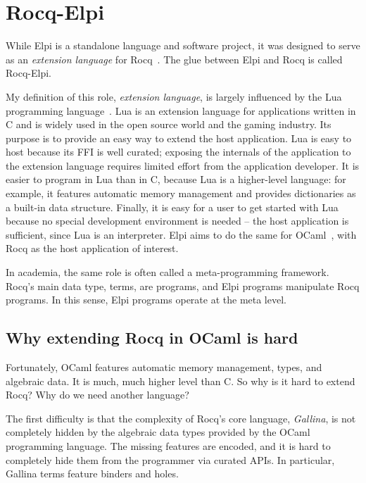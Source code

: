\documentclass{these-ISSS}
\begin{document}
\chapter{Rocq-Elpi}\label{sec:rocq}


While Elpi is a standalone language and software project, it was designed to
serve as an \emph{extension language} for Rocq~\cite{Coq-refman}.
The glue between Elpi and Rocq is called Rocq-Elpi.

My definition of this role, \emph{extension language}, is largely influenced by
the Lua programming language~\cite{10.5555/1200583}. Lua is an extension
language for applications written in C and is widely used in the open source
world and the gaming industry. Its purpose is to provide an easy way to extend
the host application. Lua is easy to host because its FFI is well curated;
exposing the internals of the application to the extension language requires
limited effort from the application developer. It is easier to program in Lua
than in C, because Lua is a higher-level language: for example, it features
automatic memory management and provides dictionaries as a built-in data
structure. Finally, it is easy for a user to get started with Lua because no
special development environment is needed -- the host application is sufficient,
since Lua is an interpreter.
Elpi aims to do the same for OCaml~\cite{leroy3ocaml}, with Rocq as the
host application of
interest.

In academia, the same role is often called a meta-programming framework. Rocq's
main data type, terms, are programs, and Elpi programs manipulate Rocq
programs. In this sense, Elpi programs operate at the meta level.


\section{Why extending Rocq in OCaml is hard}

Fortunately, OCaml features automatic memory management, types, and algebraic
data. It is much, much higher level than C. So why is it hard to extend Rocq?
Why do we need another language?

The first difficulty is that the complexity of Rocq's core language,
\emph{Gallina}, is not completely hidden by the algebraic data types
provided by the OCaml
programming language. The missing features are encoded, and it is hard to
completely hide them from the programmer via curated APIs. In particular,
Gallina terms feature binders and holes.
\end{document}
